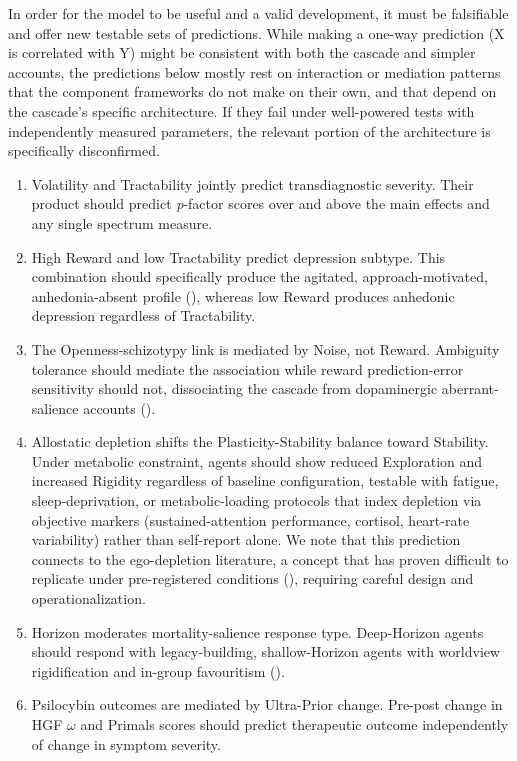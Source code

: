 \documentclass[
  jou,
  floatsintext,
  longtable,
  nolmodern,
  notxfonts,
  notimes,
  12pt,
  colorlinks=true,linkcolor=blue,citecolor=blue,urlcolor=blue]{apa7}
\providecommand{\tightlist}{%
  \setlength{\itemsep}{0pt}\setlength{\parskip}{0pt}}
\begin{document}
In order for the model to be useful and a valid development, it must be
falsifiable and offer new testable sets of predictions. While making a
one-way prediction (X is correlated with Y) might be consistent with
both the cascade and simpler accounts, the predictions below mostly rest
on interaction or mediation patterns that the component frameworks do
not make on their own, and that depend on the cascade's specific
architecture. If they fail under well-powered tests with independently
measured parameters, the relevant portion of the architecture is
specifically disconfirmed.

\begin{enumerate}
\def\labelenumi{\arabic{enumi}.}
\tightlist
\item
  Volatility and Tractability jointly predict transdiagnostic severity.
  Their product should predict \emph{p}-factor scores over and above the
  main effects and any single spectrum measure.
\item
  High Reward and low Tractability predict depression subtype. This
  combination should specifically produce the agitated,
  approach-motivated, anhedonia-absent profile
  (), whereas low Reward
  produces anhedonic depression regardless of Tractability.
\item
  The Openness-schizotypy link is mediated by Noise, not Reward.
  Ambiguity tolerance should mediate the association while reward
  prediction-error sensitivity should not, dissociating the cascade from
  dopaminergic aberrant-salience accounts
  ().
\item
  Allostatic depletion shifts the Plasticity-Stability balance toward
  Stability. Under metabolic constraint, agents should show reduced
  Exploration and increased Rigidity regardless of baseline
  configuration, testable with fatigue, sleep-deprivation, or
  metabolic-loading protocols that index depletion via objective markers
  (sustained-attention performance, cortisol, heart-rate variability)
  rather than self-report alone. We note that this prediction connects
  to the ego-depletion literature, a concept that has proven difficult
  to replicate under pre-registered conditions
  (), requiring
  careful design and operationalization.
\item
  Horizon moderates mortality-salience response type. Deep-Horizon
  agents should respond with legacy-building, shallow-Horizon agents
  with worldview rigidification and in-group favouritism
  ().
\item
  Psilocybin outcomes are mediated by Ultra-Prior change. Pre-post
  change in HGF \(\omega\) and Primals scores should predict therapeutic
  outcome independently of change in symptom severity.
\end{enumerate}
\end{document}
